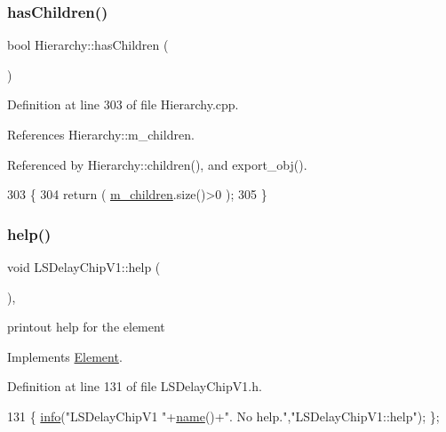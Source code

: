 \subsubsection{\texorpdfstring{has\+Children()}{hasChildren()}}
{\footnotesize\ttfamily bool Hierarchy\+::has\+Children (\begin{DoxyParamCaption}{ }\end{DoxyParamCaption})\hspace{0.3cm}{\ttfamily [inherited]}}



Definition at line 303 of file Hierarchy.\+cpp.



References Hierarchy\+::m\+\_\+children.



Referenced by Hierarchy\+::children(), and export\+\_\+obj().


\begin{DoxyCode}
303                               \{
304   \textcolor{keywordflow}{return} ( \hyperlink{classHierarchy_a038816763941fd4a930504917f60483b}{m\_children}.size()>0 );
305 \}
\end{DoxyCode}
\mbox{\label{classLSDelayChipV1_a3d57457a70f7d42687197704321b0c8e}} 
\subsubsection{\texorpdfstring{help()}{help()}}
{\footnotesize\ttfamily void L\+S\+Delay\+Chip\+V1\+::help (\begin{DoxyParamCaption}{ }\end{DoxyParamCaption})\hspace{0.3cm}{\ttfamily [inline]}, {\ttfamily [virtual]}}

printout help for the element 

Implements \hyperlink{classElement_a32c0de27acb08e17251cef88c3e9303a}{Element}.



Definition at line 131 of file L\+S\+Delay\+Chip\+V1.\+h.


\begin{DoxyCode}
131 \{ \hyperlink{classObject_a644fd329ea4cb85f54fa6846484b84a8}{info}(\textcolor{stringliteral}{"LSDelayChipV1 "}+\hyperlink{classObject_a300f4c05dd468c7bb8b3c968868443c1}{name}()+\textcolor{stringliteral}{". No help."},\textcolor{stringliteral}{"LSDelayChipV1::help"}); \};
\end{DoxyCode}
\mbox{\label{classObject_af99145335cc61ff6e2798ea17db009d2}} 
